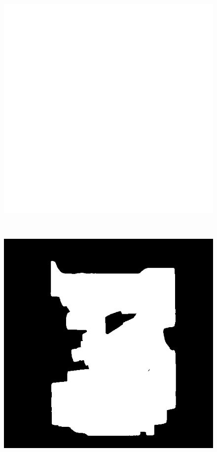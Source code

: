 \begin{figure}
	\centering
	\begin{minipage}{.33\textwidth}
		\includegraphics[width=1\linewidth]{images/engine_naive_saliencemap}
		\subcaption{}
	\end{minipage}~
	\begin{minipage}{.33\textwidth}
		\includegraphics[width=1\linewidth]{images/engine_naive_saliencemap_1_overlap}

\end{minipage}
\end{figure}
